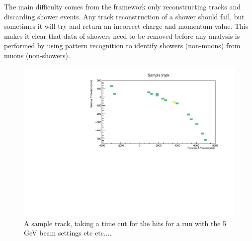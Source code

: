The main difficulty comes from the framework only reconstructing tracks and discarding shower events. Any track reconstruction of a shower should fail, but sometimes it will try and return an incorrect charge and momentum value. This makes it clear that data of showers need to be removed before any analysis is performed by using pattern recognition to identify showers (non-muons) from muons (non-showers).

\begin{figure}[h!]
\centering
\includegraphics[width=\textwidth]{figures/SampleTrack5GeVYZ.pdf}
\caption{A sample track, taking a time cut for the hits for a run with the 5 GeV beam settings etc etc....}
\label{fig:event}
\end{figure}

